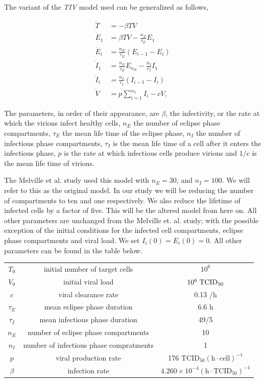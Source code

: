 \documentclass[a4paper,11pt]{article}
\begin{document}
The variant of the \textit{TIV} model used can be generalized as follows, 

\begin{align*}
\dot{T} &= -\beta TV \\
\dot{E}_1 &= \beta TV - \frac{n_E}{\tau_E}E_1 \\
\dot{E}_i &= \frac{n_E}{\tau_E}(E_{i-1}-E_i) \\ 
\dot{I}_1 &= \frac{n_E}{\tau_E}E_{n_E}-\frac{n_I}{\tau_I}I_1\\
\dot{I}_i &= \frac{n_I}{\tau_I}(I_{i-1}-I_{i}) \\
\dot{V} &= p\sum_{i=1}^{n_I}I_i - cV,
\end{align*}

 The parameters, in order of their appearance, are $\beta$, the infectivity, or the rate at which the virions infect healthy cells, $n_E$ the number of eclipse phase compartments, $\tau_E$ the mean life time of the eclipse phase, $n_I$ the number of infectious phase compartments, $\tau_I$ is the mean life time of a cell after it enters the infectious phase, $p$ is the rate at which infectious cells produce virions and $1/c$ is the mean life time of virions. 

The Melville et al. study used this model with $n_E =30$, and $n_I = 100$. We will refer to this as the original model. In our study we will be reducing the number of compartments to ten and one respectively. We also reduce the lifetime of infected cells by a factor of five. This will be the altered model from here on. All other parameters are unchanged from the Melville et. al. study; with the possible exception of the initial conditions for the infected cell compartments, eclipse phase compartments and viral load. We set $I_i(0)=E_i(0)=0$. All other parameters can be found in the table below. 


\begin{center}
\begin{tabular}{ c c c }
 $T_0$ & initial number of target cells & $10^6$ \\
 $V_0$ & initial viral load & $10^6 \hspace{1mm} \mathrm{TCID}_{50}$ \\
 $c$ & viral clearance rate & 0.13 /h \\  
 $\tau_E$ & mean eclipse phase duration & 6.6 h\\
 $\tau_I$ & mean infectious phase duration & 49/5\\
 $n_E$ & number of eclipse phase compartments & 10\\
 $n_I$ & number of infectious phase compratments & 1\\
 $p$ & viral production rate & 176 $\mathrm{TCID}_{50}(\mathrm{h \cdot cell})^{-1}$\\
 $\beta$ & infection rate & $4.260\times10^{-4} (\mathrm{h \cdot TCID_{50}})^{-1}$
\end{tabular}
\end{center}
\end{document}
